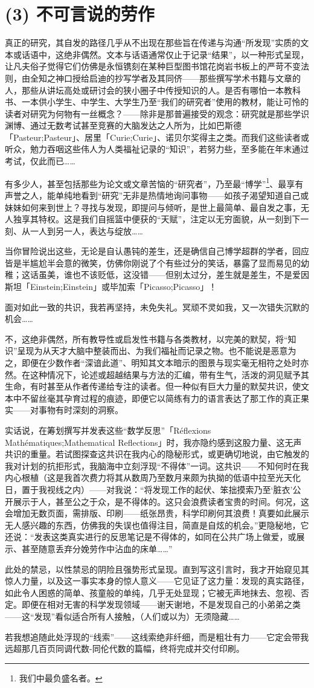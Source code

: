 \section{(3) 不可言说的劳作}

真正的研究，其自发的路径几乎从不出现在那些旨在传递与沟通“所发现”实质的文本或话语中，这绝非偶然。文本与话语通常仅止于记录“结果”，以一种形式呈现，让凡夫俗子觉得它们仿佛是永恒镌刻在某种巨型图书馆花岗岩书板上的严苛不变法则，由全知之神口授给启迪的抄写学者及其同侪——那些撰写学术书籍与文章的人，那些从讲坛高处或研讨会的狭小圈子中传授知识的人。是否有哪怕一本教科书、一本供小学生、中学生、大学生乃至“我们的研究者”使用的教材，能让可怜的读者对研究为何物有一丝概念？——除非是那普遍接受的观念：研究就是那些学识渊博、通过无数考试甚至竞赛的大脑发达之人所为，比如巴斯德「Pasteur;Pasteur」、居里「Curie;Curie」、诺贝尔奖得主之类。而我们这些读者或听众，勉力吞咽这些伟人为人类福祉记录的“知识”，若努力些，至多能在年末通过考试，仅此而已……

有多少人，甚至包括那些为论文或文章苦恼的“研究者”，乃至最“博学”\footnote{我们中最负盛名者。}、最享有声誉之人，能单纯地看到“研究”无非是热情地询问事物——如孩子渴望知道自己或妹妹如何来到世上？寻找与发现，即提问与倾听，是世上最简单、最自发之事，无人独享其特权。这是我们自摇篮中便获的“天赋”，注定以无穷面貌，从一刻到下一刻、从一人到另一人，表达与绽放……

当你冒险说出这些，无论是自认愚钝的差生，还是确信自己博学超群的学者，回应皆是半尴尬半会意的微笑，仿佛你刚说了个有些过分的笑话，暴露了显而易见的幼稚；这话虽美，谁也不该贬低，这没错——但别太过分，差生就是差生，不是爱因斯坦「Einstein;Einstein」或毕加索「Picasso;Picasso」！

面对如此一致的共识，我若再坚持，未免失礼。冥顽不灵如我，又一次错失沉默的机会……

不，这绝非偶然，所有教导性或启发性书籍与各类教材，以完美的默契，将“知识”呈现为从天才大脑中整装而出、为我们福祉而记录之物。也不能说是恶意为之，即便在少数作者“深谙此道”、明知其文本暗示的图景与现实毫无相符之处时亦然。在这种情况下，论述或超越结果与方法的汇编，带有生气，活泼的洞见赋予其生命，有时甚至从作者传递给专注的读者。但一种似有巨大力量的默契共识，使文本中不留丝毫其孕育过程的痕迹，即便它以简练有力的语言表达了那工作的真正果实——对事物有时深刻的洞察。

实话说，在筹划撰写并发表这些“数学反思”「Réflexions Mathématiques;Mathematical Reflections」时，我亦隐约感到这股力量、这无声共识的重量。若试图探查这共识在我内心的隐秘形式，或更确切地说，由它触发的我对计划的抗拒形式，我脑海中立刻浮现“不得体”一词。这共识——不知何时在我内心根植（这是我首次费力将其从数周乃至数月来颇为执拗的低语中拉至光天化日，置于我视线之内）——对我说：“将发现工作的起伏、笨拙摸索乃至‘脏衣’公开展示于人，甚至公之于众，是不得体的。这只会浪费读者宝贵的时间。何况，这会增加无数页面，需排版、印刷——纸张昂贵，科学印刷何其浪费！真要如此展示无人感兴趣的东西，仿佛我的失误也值得注目，简直是自炫的机会。”更隐秘地，它还说：“发表这类真实进行的反思笔记是不得体的，如同在公共广场上做爱，或展示、甚至随意丢弃分娩劳作中沾血的床单……”

此处的禁忌，以性禁忌的阴险且强势形式呈现。直到写这引言时，我才开始窥见其惊人力量，以及这一事实本身的惊人意义——它见证了这力量：发现的真实路径，如此令人困惑的简单、孩童般的单纯，几乎无处显现；它被无声地抹去、忽视、否定。即便在相对无害的科学发现领域——谢天谢地，不是发现自己的小弟弟之类——这“发现”看似适合所有人接触，（人们或以为）无须隐藏……

若我想追随此处浮现的“线索”——这线索绝非纤细，而是粗壮有力——它定会带我远超那几百页同调代数-同伦代数的篇幅，终将完成并交付印刷。